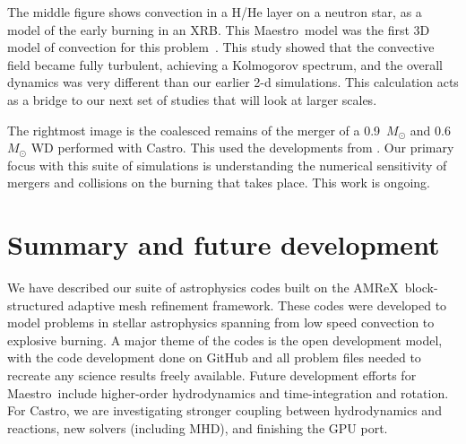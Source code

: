 \documentclass[a4paper]{jpconf}
\newcommand{\maestro}{{\sffamily Maestro}}
\newcommand{\castro}{{\sffamily Castro}}
\newcommand{\amrex}{{\sffamily AMReX}}
\begin{document}
The middle figure shows convection in a H/He layer on a neutron star,
as a model of the early burning in an XRB.  This \maestro\ model was
the first 3D model of convection for this problem~\cite{xrb3}.  This
study showed that the convective field became fully turbulent,
achieving a Kolmogorov spectrum, and the overall dynamics was very
different than our earlier 2-d simulations.  This calculation acts as 
a bridge to our next set of studies that will look at larger scales.

The rightmost image is the coalesced remains of the merger of a
0.9~$M_\odot$ and 0.6~$M_\odot$ WD performed with \castro.  This used
the developments from \cite{wdmergerI}.  Our primary focus with this
suite of simulations is understanding the numerical sensitivity of
mergers and collisions on the burning that takes place.  This work
is ongoing.


\section{Summary and future development}

We have described our suite of astrophysics codes built on the
\amrex\ block-structured adaptive mesh refinement framework.  These
codes were developed to model problems in stellar astrophysics
spanning from low speed convection to explosive burning.  A major
theme of the codes is the open development model, with the code
development done on GitHub and all problem files needed to recreate
any science results freely available.  Future development efforts for
\maestro\ include higher-order hydrodynamics and time-integration and
rotation.  For \castro, we are investigating stronger coupling between
hydrodynamics and reactions, new solvers (including MHD), and
finishing the GPU port.
\end{document}
